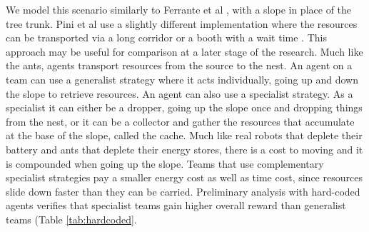 \documentclass[12pt]{article}
\begin{document}
We model this scenario similarly to Ferrante et al \cite{ferrante:PLOS_CB:2015}, with a slope in place of the tree trunk. 
Pini et al use a slightly different implementation where the resources can be transported via a long corridor or a booth with a wait time \cite{pini:ICSI:2012, pini:Swarm_Intelligence:2011}. 
This approach may be useful for comparison at a later stage of the research.
Much like the ants, agents transport resources from the source to the nest.
An agent on a team can use a generalist strategy where it acts individually, going up and down the slope to retrieve resources.
An agent can also use a specialist strategy. 
As a specialist it can either be a dropper, going up the slope once and dropping things from the nest, or it can be a collector and gather the resources that accumulate at the base of the slope, called the cache.
Much like real robots that deplete their battery and ants that deplete their energy stores, there is a cost to moving and it is compounded when going up the slope. 
Teams that use complementary specialist strategies pay a smaller energy cost as well as time cost, since resources slide down faster than they can be carried. 
Preliminary analysis with hard-coded agents verifies that specialist teams gain higher overall reward than generalist teams (Table \ref{tab:hardcoded}.\\
\end{document}

